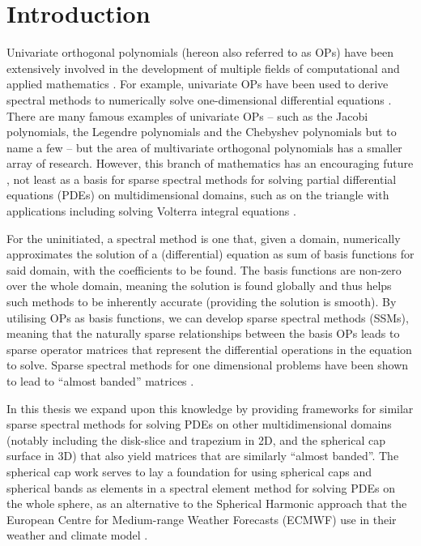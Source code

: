 
\chapter{Introduction}

Univariate orthogonal polynomials (hereon also referred to as OPs) have been extensively involved in the development of multiple fields of computational and applied mathematics \cite{onedimopsrefs} . For example, univariate OPs have been used to derive spectral methods to numerically solve one-dimensional differential equations \cite{boyd2001chebyshev, olver2013fast}. There are many famous examples of univariate OPs -- such as the Jacobi polynomials, the Legendre polynomials and the Chebyshev polynomials but to name a few \cite[Section 18.3]{DLMF} -- but the area of multivariate orthogonal polynomials has a smaller array of research. However, this branch of mathematics has an encouraging future \cite{dunkl2014orthogonal}, not least as a basis for sparse spectral methods for solving partial differential equations (PDEs) on multidimensional domains, such as on the triangle \cite{olver2019triangle} with applications including solving Volterra integral equations \cite{gutleb2020sparse}. 

For the uninitiated, a spectral method is one that, given a domain, numerically approximates the solution of a (differential) equation as sum of basis functions for said domain, with the coefficients to be found. The basis functions are non-zero over the whole domain, meaning the solution is found globally and thus helps such methods to be inherently accurate (providing the solution is smooth). By utilising OPs as basis functions, we can develop sparse spectral methods (SSMs), meaning that the naturally sparse relationships between the basis OPs leads to sparse operator matrices that represent the differential operations in the equation to solve. Sparse spectral methods for one dimensional problems have been shown to lead to \enquote{almost banded} matrices \cite{olver2013fast}. 

In this thesis we expand upon this knowledge by providing frameworks for similar sparse spectral methods for solving PDEs on other multidimensional domains (notably including the disk-slice and trapezium in 2D, and the spherical cap surface in 3D) that also yield matrices that are similarly \enquote{almost banded}. The spherical cap work serves to lay a foundation for using spherical caps and spherical bands as elements in a spectral element method for solving PDEs on the whole sphere, as an alternative to the Spherical Harmonic approach that the European Centre for Medium-range Weather Forecasts (ECMWF) use in their weather and climate model \cite{cheong2006dynamical}.

